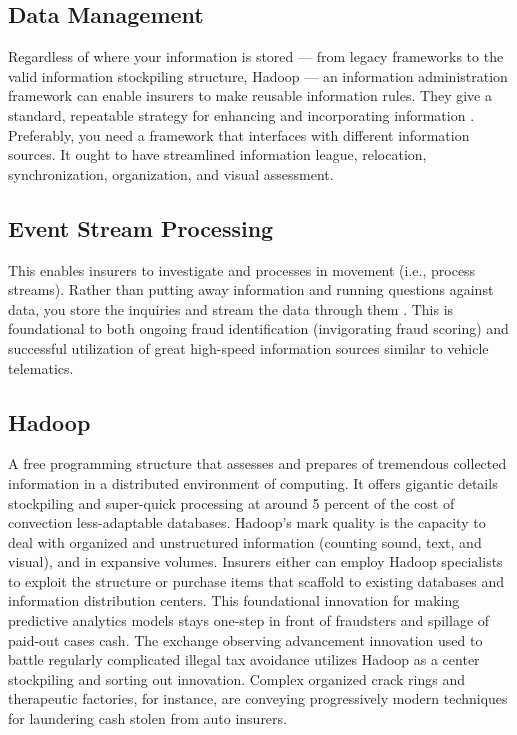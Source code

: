 \documentclass[sigconf]{acmart}
\begin{document}
\subsection{Data Management}

Regardless of where your information is stored — from legacy frameworks to the valid information stockpiling structure, Hadoop — an information administration framework can enable insurers to make reusable information rules. They give a standard, repeatable strategy for enhancing and incorporating information \cite{17}. Preferably, you need a framework that interfaces with different information sources. It ought to have streamlined information league, relocation, synchronization, organization, and visual assessment. 


\subsection{Event Stream Processing}

This enables insurers to investigate and processes in movement (i.e., process streams). Rather than putting away information and running questions against data, you store the inquiries and stream the data through them \cite{12}. This is foundational to both ongoing fraud identification (invigorating fraud scoring) and successful utilization of great high-speed information sources similar to vehicle telematics. 

\subsection{Hadoop}
A free programming structure that assesses and prepares of tremendous collected information in a distributed environment of computing. It offers gigantic details stockpiling and super-quick processing at around 5 percent of the cost of convection less-adaptable databases. Hadoop's mark quality is the capacity to deal with organized and unstructured information (counting sound, text, and visual), and in expansive volumes. Insurers either can employ Hadoop specialists to exploit the structure or purchase items that scaffold to existing databases and information distribution centers\cite{16,17}. This foundational innovation for making predictive analytics models stays one-step in front of fraudsters and spillage of paid-out cases cash. The exchange observing advancement innovation used to battle regularly complicated illegal tax avoidance utilizes Hadoop as a center stockpiling and sorting out innovation. Complex organized crack rings and therapeutic factories, for instance, are conveying progressively modern techniques for laundering cash stolen from auto insurers.
\end{document}
